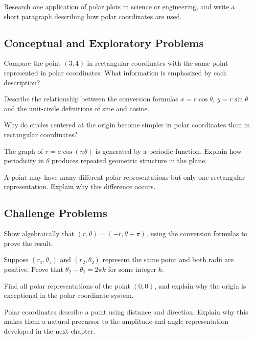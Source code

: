 \begin{exercise}
Research one application of polar plots in science or engineering, and
write a short paragraph describing how polar coordinates are used.
\end{exercise}

\subsection*{Conceptual and Exploratory Problems}
\begin{exercise}
Compare the point $(3,4)$ in rectangular coordinates with the same
point represented in polar coordinates. What information is emphasized
by each description?
\end{exercise}

\begin{exercise}
Describe the relationship between the conversion formulas $x=r\cos\theta$,
$y=r\sin\theta$ and the unit-circle definitions of sine and cosine.
\end{exercise}

\begin{exercise}
Why do circles centered at the origin become simpler in polar
coordinates than in rectangular coordinates?
\end{exercise}

\begin{exercise}
The graph of $r = a\cos(n\theta)$ is generated by a periodic function.
Explain how periodicity in $\theta$ produces repeated geometric
structure in the plane.
\end{exercise}

\begin{exercise}
A point may have many different polar representations but only one
rectangular representation. Explain why this difference occurs.
\end{exercise}

\subsection*{Challenge Problems}
\begin{exercise}
Show algebraically that $(r,\theta) = (-r,\theta+\pi)$, using the
conversion formulas to prove the result.
\end{exercise}

\begin{exercise}
Suppose $(r_1,\theta_1)$ and $(r_2,\theta_2)$ represent the same point
and both radii are positive. Prove that $\theta_2 - \theta_1 = 2\pi k$
for some integer $k$.
\end{exercise}

\begin{exercise}
Find all polar representations of the point $(0,0)$, and explain why the
origin is exceptional in the polar coordinate system.
\end{exercise}

\begin{exercise}
Polar coordinates describe a point using distance and direction. Explain
why this makes them a natural precursor to the amplitude-and-angle
representation developed in the next chapter.
\end{exercise}
